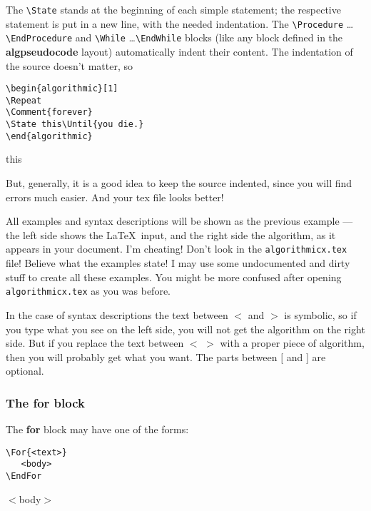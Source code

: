 \documentclass{article}
\newcommand\ASTART{\bigskip\noindent\begin{minipage}[b]{0.5\linewidth}}
\newcommand\ACONTINUE{\end{minipage}\begin{minipage}[b]{0.5\linewidth}}
\newcommand\AENDSKIP{\end{minipage}\bigskip}
\newcommand\AEND{\end{minipage}}
\begin{document}
The \verb:\State: stands at the beginning of each simple statement; the respective 
statement is put in a new line, with the needed indentation.
The \verb:\Procedure: \dots\verb:\EndProcedure: and 
\verb:\While: \dots\verb:\EndWhile: blocks (like any block defined in the 
\textbf{algpseudocode} layout) automatically indent their content.
The indentation of the source doesn't matter, so

\ASTART
\begin{verbatim}
\begin{algorithmic}[1]
\Repeat
\Comment{forever}
\State this\Until{you die.}
\end{algorithmic}
\end{verbatim}
\ACONTINUE
\begin{algorithmic}[1]
\Repeat
{}
\State this
\Statex
\end{algorithmic}
\AENDSKIP

But, generally, it is a good idea to keep the source indented, since you will find 
errors much easier. And your tex file looks better!

All examples and syntax descriptions will be shown as the previous 
example --- the left side shows the \LaTeX\ input, and the right side 
the algorithm, as it appears in your document. I'm cheating! Don't look 
in the \verb:algorithmicx.tex: file! Believe what the examples state! I may use some 
undocumented and dirty stuff to create all these examples. You might be more 
confused after opening \verb:algorithmicx.tex: as you was before.

In the case of syntax 
descriptions the text between $<$ and $>$ is symbolic, so if you type 
what you see on the left side, you will not get the algorithm on the 
right side. But if you replace the text between $<$ $>$ with a proper piece of 
algorithm, then you will probably get what you want. The parts between 
$[$ and $]$ are optional.


\subsubsection{The \textbf{for} block}
The \textbf{for} block may have one of the forms:

\ASTART
\begin{verbatim}
\For{<text>}
   <body>
\EndFor
\end{verbatim}
\ACONTINUE
\begin{algorithmic}[1]
   \State $<$body$>$
\EndFor
\end{algorithmic}
\AEND
\end{document}
